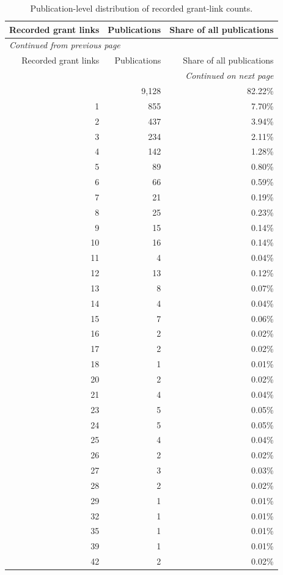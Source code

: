 \documentclass[11pt]{article}
\begin{document}
\begin{longtable}{rrr}
\caption{Publication-level distribution of recorded grant-link counts.}\label{tab:s7-grant-degree}\\
\toprule
Recorded grant links & Publications & Share of all publications \\
\midrule
\endfirsthead
\multicolumn{3}{l}{\small\itshape Continued from previous page} \\
\toprule
Recorded grant links & Publications & Share of all publications \\
\midrule
\endhead
\midrule
\multicolumn{3}{r}{\small\itshape Continued on next page} \\
\endfoot
\bottomrule
\endlastfoot
0 & 9,128 & 82.22\% \\
1 & 855 & 7.70\% \\
2 & 437 & 3.94\% \\
3 & 234 & 2.11\% \\
4 & 142 & 1.28\% \\
5 & 89 & 0.80\% \\
6 & 66 & 0.59\% \\
7 & 21 & 0.19\% \\
8 & 25 & 0.23\% \\
9 & 15 & 0.14\% \\
10 & 16 & 0.14\% \\
11 & 4 & 0.04\% \\
12 & 13 & 0.12\% \\
13 & 8 & 0.07\% \\
14 & 4 & 0.04\% \\
15 & 7 & 0.06\% \\
16 & 2 & 0.02\% \\
17 & 2 & 0.02\% \\
18 & 1 & 0.01\% \\
20 & 2 & 0.02\% \\
21 & 4 & 0.04\% \\
23 & 5 & 0.05\% \\
24 & 5 & 0.05\% \\
25 & 4 & 0.04\% \\
26 & 2 & 0.02\% \\
27 & 3 & 0.03\% \\
28 & 2 & 0.02\% \\
29 & 1 & 0.01\% \\
32 & 1 & 0.01\% \\
35 & 1 & 0.01\% \\
39 & 1 & 0.01\% \\
42 & 2 & 0.02\% \\
\end{longtable}
\end{document}

